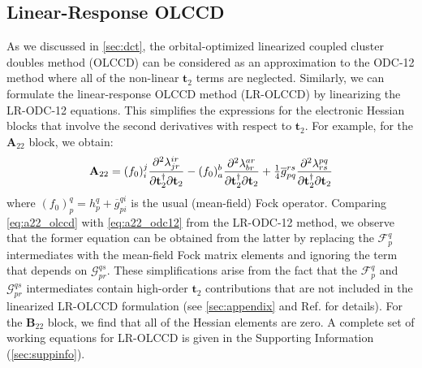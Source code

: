 \subsection{Linear-Response OLCCD}
\label{sec:olccd}
As we discussed in \cref{sec:dct}, the orbital-optimized linearized coupled cluster doubles method (OLCCD) can be considered as an approximation to the ODC-12 method where all of the non-linear $\mathbf{t}_2$ terms are neglected. Similarly, we can formulate the linear-response OLCCD method (LR-OLCCD) by linearizing the LR-ODC-12 equations. This simplifies the expressions for the electronic Hessian blocks that involve the second derivatives with respect to $\mathbf{t}_2$. For example, for the $\mathbf{A}_{22}$ block, we obtain:
\begin{equation}
    \label{eq:a22_olccd}
    \mathbf{A}_{22}
    =
    (f_0)_i^j
    \dfrac{\partial^2 \lambda^{ir}_{jr}}{%
        \partial\mathbf{t}_2^\dagger
        \partial\mathbf{t}_2
    }
    -
    (f_0)_a^b
    \dfrac{\partial^2 \lambda^{ar}_{br}}{%
        \partial\mathbf{t}_2^\dagger
        \partial\mathbf{t}_2
    }
    +
    \tfrac{1}{4}
    \overline{g}_{pq}^{rs}
    \dfrac{\partial^2 \lambda^{pq}_{rs}}{%
        \partial\mathbf{t}_2^\dagger
        \partial\mathbf{t}_2
    }
\end{equation}
where
\(
    (f_0)_p^q
    =
    h_p^q
    +
    \overline{g}_{pi}^{qi}
\)
is the usual (mean-field) Fock operator.
Comparing \cref{eq:a22_olccd} with \cref{eq:a22_odc12} from the LR-ODC-12
method, we observe that the former equation can be obtained from the latter by
replacing the $\mathcal{F}_p^q$ intermediates with the mean-field Fock matrix
elements and ignoring the term that depends on $\mathcal{G}_{pr}^{qs}$.
These simplifications arise from the fact that the $\mathcal{F}_p^q$ and
$\mathcal{G}_{pr}^{qs}$ intermediates contain high-order $\mathbf{t}_2$
contributions that are not included in the linearized LR-OLCCD formulation (see
\cref{sec:appendix} and Ref.\@ {} for details).
For the $\mathbf{B}_{22}$ block, we find that all of the Hessian elements are
zero.
A complete set of working equations for LR-OLCCD is given in the Supporting
Information (\cref{sec:suppinfo}).


